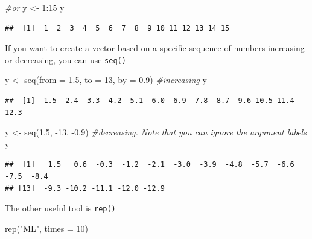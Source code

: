 \documentclass[
]{book}
\newenvironment{Shaded}{\begin{snugshade}}{\end{snugshade}}
\newcommand{\AttributeTok}[1]{\textcolor[rgb]{0.77,0.63,0.00}{#1}}
\newcommand{\CommentTok}[1]{\textcolor[rgb]{0.56,0.35,0.01}{\textit{#1}}}
\newcommand{\DecValTok}[1]{\textcolor[rgb]{0.00,0.00,0.81}{#1}}
\newcommand{\FloatTok}[1]{\textcolor[rgb]{0.00,0.00,0.81}{#1}}
\newcommand{\FunctionTok}[1]{\textcolor[rgb]{0.00,0.00,0.00}{#1}}
\newcommand{\NormalTok}[1]{#1}
\newcommand{\OtherTok}[1]{\textcolor[rgb]{0.56,0.35,0.01}{#1}}
\newcommand{\SpecialCharTok}[1]{\textcolor[rgb]{0.00,0.00,0.00}{#1}}
\newcommand{\StringTok}[1]{\textcolor[rgb]{0.31,0.60,0.02}{#1}}
\begin{document}
\begin{Shaded}
\begin{Highlighting}[]
\CommentTok{\#or}
\NormalTok{y }\OtherTok{\textless{}{-}} \DecValTok{1}\SpecialCharTok{:}\DecValTok{15}
\NormalTok{y}
\end{Highlighting}
\end{Shaded}

\begin{verbatim}
##  [1]  1  2  3  4  5  6  7  8  9 10 11 12 13 14 15
\end{verbatim}

If you want to create a vector based on a specific sequence of numbers increasing or decreasing, you can use \texttt{seq()}

\begin{Shaded}
\begin{Highlighting}[]
\NormalTok{y }\OtherTok{\textless{}{-}} \FunctionTok{seq}\NormalTok{(}\AttributeTok{from =} \FloatTok{1.5}\NormalTok{, }\AttributeTok{to =} \DecValTok{13}\NormalTok{, }\AttributeTok{by =} \FloatTok{0.9}\NormalTok{) }\CommentTok{\#increasing}
\NormalTok{y}
\end{Highlighting}
\end{Shaded}

\begin{verbatim}
##  [1]  1.5  2.4  3.3  4.2  5.1  6.0  6.9  7.8  8.7  9.6 10.5 11.4 12.3
\end{verbatim}

\begin{Shaded}
\begin{Highlighting}[]
\NormalTok{y }\OtherTok{\textless{}{-}} \FunctionTok{seq}\NormalTok{(}\FloatTok{1.5}\NormalTok{, }\SpecialCharTok{{-}}\DecValTok{13}\NormalTok{, }\SpecialCharTok{{-}}\FloatTok{0.9}\NormalTok{) }\CommentTok{\#decreasing.  Note that you can ignore the argument labels}
\NormalTok{y}
\end{Highlighting}
\end{Shaded}

\begin{verbatim}
##  [1]   1.5   0.6  -0.3  -1.2  -2.1  -3.0  -3.9  -4.8  -5.7  -6.6  -7.5  -8.4
## [13]  -9.3 -10.2 -11.1 -12.0 -12.9
\end{verbatim}

The other useful tool is \texttt{rep()}

\begin{Shaded}
\begin{Highlighting}[]
\FunctionTok{rep}\NormalTok{(}\StringTok{"ML"}\NormalTok{, }\AttributeTok{times =} \DecValTok{10}\NormalTok{)}
\end{Highlighting}
\end{Shaded}
\end{document}
